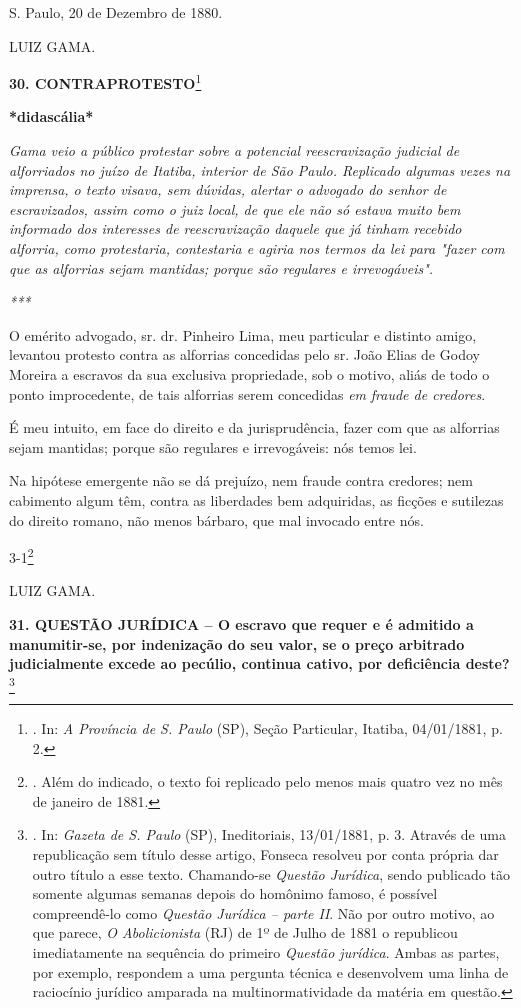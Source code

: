 S. Paulo, 20 de Dezembro de 1880.

LUIZ GAMA.

\textbf{30. CONTRAPROTESTO}\footnote{. In: \emph{A Província de S.
  Paulo} (SP), Seção Particular, Itatiba, 04/01/1881, p. 2.}

\textbf{*didascália*}

\emph{Gama veio a público protestar sobre a potencial reescravização
judicial de alforriados no juízo de Itatiba, interior de São Paulo.
Replicado algumas vezes na imprensa, o texto visava, sem dúvidas,
alertar o advogado do senhor de escravizados, assim como o juiz local,
de que ele não só estava muito bem informado dos interesses de
reescravização daquele que já tinham recebido alforria, como
protestaria, contestaria e agiria nos termos da lei para "fazer com que
as alforrias sejam mantidas; porque são regulares e irrevogáveis". }

\emph{***}

O emérito advogado, sr. dr. Pinheiro Lima, meu particular e distinto
amigo, levantou protesto contra as alforrias concedidas pelo sr. João
Elias de Godoy Moreira a escravos da sua exclusiva propriedade, sob o
motivo, aliás de todo o ponto improcedente, de tais alforrias serem
concedidas \emph{em} \emph{fraude de credores}.

É meu intuito, em face do direito e da jurisprudência, fazer com que as
alforrias sejam mantidas; porque são regulares e irrevogáveis: nós temos
lei.

Na hipótese emergente não se dá prejuízo, nem fraude contra credores;
nem cabimento algum têm, contra as liberdades bem adquiridas, as ficções
e sutilezas do direito romano, não menos bárbaro, que mal invocado entre
nós.

3-1\footnote{. Além do indicado, o texto foi replicado pelo menos mais
  quatro vez no mês de janeiro de 1881.}

LUIZ GAMA.

\textbf{31. QUESTÃO JURÍDICA -- O escravo que requer e é admitido a
manumitir-se, por indenização do seu valor, se o preço arbitrado
judicialmente excede ao pecúlio, continua cativo, por deficiência
deste?}\footnote{. In: \emph{Gazeta de S. Paulo} (SP), Ineditoriais,
  13/01/1881, p. 3. Através de uma republicação sem título desse artigo,
  Fonseca resolveu por conta própria dar outro título a esse texto.
  Chamando-se \emph{Questão Jurídica}, sendo publicado tão somente
  algumas semanas depois do homônimo famoso, é possível compreendê-lo
  como \emph{Questão Jurídica -- parte II}. Não por outro motivo, ao que
  parece, \emph{O Abolicionista} (RJ) de 1º de Julho de 1881 o
  republicou imediatamente na sequência do primeiro \emph{Questão
  jurídica}. Ambas as partes, por exemplo, respondem a uma pergunta
  técnica e desenvolvem uma linha de raciocínio jurídico amparada na
  multinormatividade da matéria em questão.}

